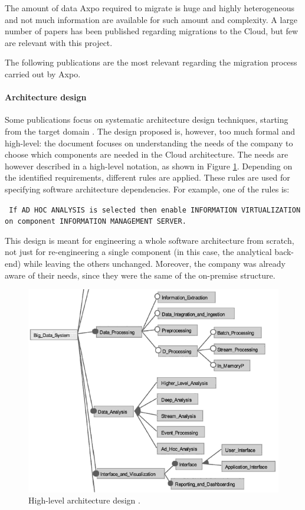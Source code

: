 The amount of data Axpo required to migrate is huge and highly heterogeneous and not much information are available for such amount and complexity.
A large number of papers has been published regarding migrations to the Cloud, but few are relevant with this project.

The following publications are the most relevant regarding the migration process carried out by Axpo.

\paragraph{Architecture design}
    Some publications focus on systematic architecture design techniques, starting from the target domain \cite{bib:related_work:books:architecture}.
    The design proposed is, however, too much formal and high-level: the document focuses on understanding the needs of the company to choose which components are needed in the Cloud architecture.
    The needs are however described in a high-level notation, as shown in Figure \ref{fig:related:architecture_high_level}.
    Depending on the identified requirements, different rules are applied.
    These rules are used for specifying software architecture dependencies.
    For example, one of the rules is:
        \begin{center}
            \texttt{
                If AD HOC ANALYSIS is selected then enable INFORMATION VIRTUALIZATION on component INFORMATION MANAGEMENT SERVER.
            }
        \end{center}
    
    This design is meant for engineering a whole software architecture from scratch, not just for re-engineering a single component (in this case, the analytical back-end) while leaving the others unchanged.
    Moreover, the company was already aware of their needs, since they were the same of the on-premise structure.
    
    \begin{figure}
        \centering
        \includegraphics[width=.8\textwidth]{res/relatedwork/architecture_high_level.png}
        \caption{High-level architecture design \cite{bib:related_work:books:architecture}.}
        \label{fig:related:architecture_high_level}
    \end{figure}
    
